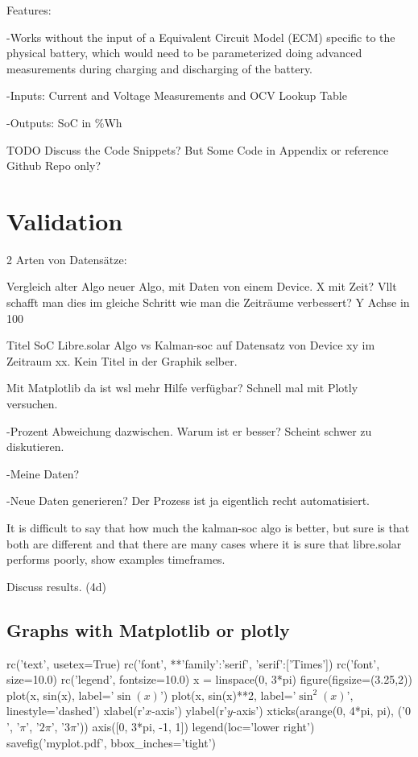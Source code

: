 Features: \

-Works without the input of a Equivalent Circuit Model (ECM) specific to the physical battery, which would need to be parameterized doing advanced measurements during charging and discharging of the battery. 

-Inputs: Current and Voltage Measurements and OCV Lookup Table

-Outputs: SoC in \%Wh

TODO Discuss the Code Snippets? But Some Code in Appendix or reference Github Repo only? 
\chapter{Validation}

2 Arten von Datensätze: 



Vergleich alter Algo neuer Algo, mit Daten von einem Device. X mit Zeit? Vllt schafft man dies im gleiche Schritt wie man die Zeiträume verbessert? Y Achse in 100%

Titel SoC Libre.solar Algo vs Kalman-soc auf Datensatz von Device xy im Zeitraum xx. Kein Titel in der Graphik selber. 

Mit Matplotlib da ist wsl mehr Hilfe verfügbar? Schnell mal mit Plotly versuchen. 



-Prozent Abweichung dazwischen. Warum ist er besser? Scheint schwer zu diskutieren.



-Meine Daten? 



-Neue Daten generieren? Der Prozess ist ja eigentlich recht automatisiert. 



It is difficult to say that how much the kalman-soc algo is better, but sure is that both are different and that there are many cases where it is sure that libre.solar performs poorly, show examples timeframes.

Discuss results.  (4d)

\section{Graphs with Matplotlib or plotly}


\begin{pylabcode}[plotsession]
rc('text', usetex=True)
rc('font', **{'family':'serif', 'serif':['Times']})
rc('font', size=10.0)			
rc('legend', fontsize=10.0)
x = linspace(0, 3*pi)
figure(figsize=(3.25,2))
plot(x, sin(x), label='$\sin(x)$')
plot(x, sin(x)**2, label='$\sin^2(x)$',
linestyle='dashed')
xlabel(r'$x$-axis')
ylabel(r'$y$-axis')
xticks(arange(0, 4*pi, pi), ('$0$',
'$\pi$', '$2\pi$', '$3\pi$'))
axis([0, 3*pi, -1, 1])
legend(loc='lower right')
savefig('myplot.pdf', bbox_inches='tight')
\end{pylabcode}


